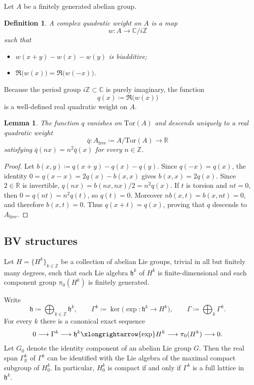\documentclass[12pt]{amsart}
\numberwithin{table}{section}
\numberwithin{equation}{section}
\newtheorem{defn}{Definition}[section]
\newtheorem{lem}{Lemma}[section]
\theoremstyle{plain}
\newcommand{\fh}{\mathfrak{h}}
\newcommand{\R}{\mathbb{R}}
\newcommand{\C}{\mathbb{C}}
\newcommand{\Z}{\mathbb{Z}}
\newcommand{\Tor}{\mathrm{Tor}}
\begin{document}
Let $A$ be a finitely generated abelian group. 

\begin{defn}
A complex \emph{quadratic weight} on $A$ is a map
\[
w:A\longrightarrow\C/i\Z
\]
such that
\begin{itemize}
	\item $w(x+y)-w(x)-w(y)$ is biadditive;
	\item $\Re\bigl(w(x)\bigr)=\Re\bigl(w(-x)\bigr)$.
\end{itemize}
\end{defn}

Because the period group $i \Z \subset \C$ is purely imaginary, the function
\[
q(x)\coloneq\Re\bigl(w(x)\bigr)
\]
is a well-defined real quadratic weight on $A$.

\begin{lem}\label{lem:real-quadratic}
The function $q$ vanishes on $\Tor(A)$ and descends uniquely to a real quadratic weight
\[
\bar q:A_{\mathrm{free}}\coloneq A/\Tor(A)\longrightarrow\R
\]
satisfying $\bar q(nx)=n^2\bar q(x)$ for every $n\in\Z$.
\end{lem}

\begin{proof}
Let $b(x,y)\coloneqq q(x+y)-q(x)-q(y)$. Since $q(-x)=q(x)$, the identity $0=q(x-x)=2q(x)-b(x,x)$ gives $b(x,x)=2q(x)$. Since $2 \in \R$ is invertible, $q(nx)= b(nx,nx)/2=n^2q(x)$. If $t$ is torsion and $nt=0$, then $0=q(nt)=n^2q(t)$, so $q(t)=0$. Moreover $n b(x,t)=b(x,nt)=0$, and therefore $b(x,t)=0$. Thus $q(x+t)=q(x)$, proving that $q$ descends to $A_{\mathrm{free}}$.
\end{proof}

\subsection{BV structures}

Let $H=\{H^k\}_{k\in\Z}$ be a collection of abelian Lie groups, trivial in all but finitely many degrees, such that each Lie algebra $\fh^k$ of $H^k$ is finite-dimensional and each component group $\pi_0(H^k)$ is finitely generated.

Write
\[
\fh \coloneq \bigoplus_{k\in\Z}\fh^k,
\qquad
\Gamma^k \coloneq \ker\bigl(\exp:\fh^k\to H^k\bigr),
\qquad
\Gamma \coloneq \bigoplus_k\Gamma^k.
\]
For every $k$ there is a canonical exact sequence
\begin{equation}\label{eq:exp-sequence}
	0\longrightarrow \Gamma^k
	\longrightarrow \fh^k
	\xlongrightarrow{\exp} H^k
	\longrightarrow \pi_0(H^k)
	\longrightarrow 0.
\end{equation}
Let $G_0$ denote the identity component of an abelian Lie group $G$. Then the real span $\Gamma^k_\R$ of $\Gamma^k$ can be identified with the Lie algebra of the maximal compact subgroup of $H_0^k$. In particular, $H_0^k$ is compact if and only if $\Gamma^k$ is a full lattice in $\fh^k$.
\end{document}
